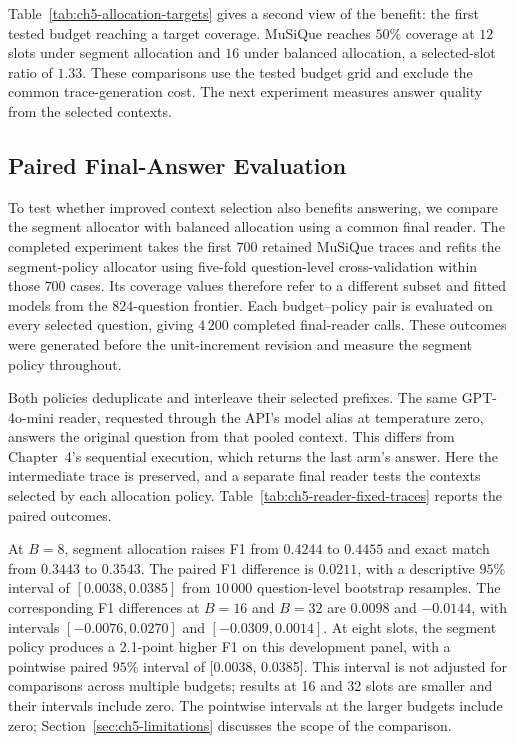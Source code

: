 Table~\ref{tab:ch5-allocation-targets} gives a second view of the benefit:
the first tested budget reaching a target coverage. MuSiQue reaches
$50\%$ coverage at $12$ slots under segment allocation and $16$ under
balanced allocation, a selected-slot ratio of $1.33$. These comparisons
use the tested budget grid and exclude the common trace-generation cost.
The next experiment measures answer quality from the selected contexts.

\subsection{Paired Final-Answer Evaluation}

To test whether improved context selection also benefits answering, we compare
the segment allocator with balanced allocation using a common final reader.
The completed experiment takes the first $700$ retained MuSiQue
traces and refits the segment-policy allocator using five-fold question-level
cross-validation within those $700$ cases. Its coverage values therefore
refer to a different subset and fitted models from the $824$-question
frontier. Each budget--policy pair is evaluated on every selected question,
giving $4\,200$ completed final-reader calls.
These outcomes were generated before the unit-increment revision and
measure the segment policy throughout.

Both policies deduplicate and interleave their selected prefixes. The same
GPT-4o-mini reader, requested through the API's model alias at temperature
zero, answers the original question from that pooled context.
This differs from Chapter~4's sequential execution, which returns the last
arm's answer. Here the intermediate trace is preserved, and a separate final
reader tests the contexts selected by each allocation policy.
Table~\ref{tab:ch5-reader-fixed-traces} reports the paired outcomes.



At $B=8$, segment allocation raises F1 from $0.4244$ to $0.4455$ and
exact match from $0.3443$ to $0.3543$. The paired F1 difference is
$0.0211$, with a descriptive $95\%$ interval of $[0.0038,0.0385]$ from
$10\,000$ question-level bootstrap resamples. The corresponding F1
differences at $B=16$ and $B=32$ are $0.0098$ and $-0.0144$, with
intervals $[-0.0076,0.0270]$ and $[-0.0309,0.0014]$. At eight slots, the segment policy produces a 2.1-point higher F1 on this development panel, with a pointwise paired $95\%$ interval of [0.0038, 0.0385]. This interval is not adjusted for comparisons across multiple budgets; results at 16 and 32 slots are smaller and their intervals include zero. The pointwise intervals at the larger
budgets include zero; Section~\ref{sec:ch5-limitations} discusses the
scope of the comparison.

